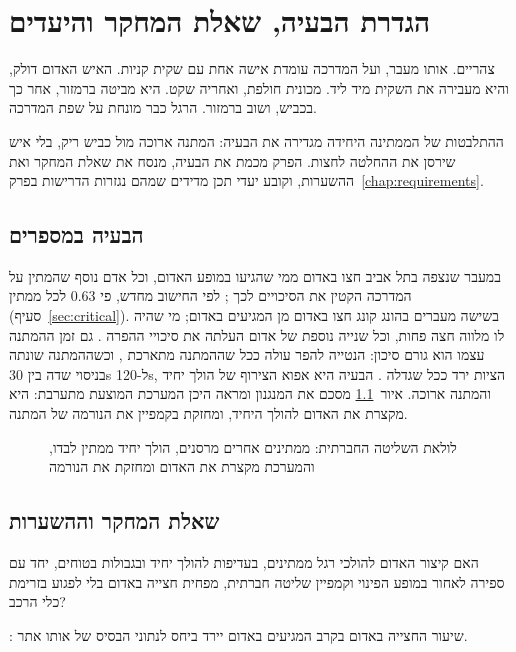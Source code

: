 \chapter{הגדרת הבעיה, שאלת המחקר והיעדים}\label{chap:problem}
\begin{scenebox}
צהריים. אותו מעבר, ועל המדרכה עומדת אישה אחת עם שקית קניות. האיש האדום דולק, והיא מעבירה את השקית מיד ליד.
מכונית חולפת, ואחריה שקט. היא מביטה ברמזור, אחר כך בכביש, ושוב ברמזור.
הרגל כבר מונחת על שפת המדרכה.
\end{scenebox}

ההתלבטות של הממתינה היחידה מגדירה את הבעיה: המתנה ארוכה מול כביש ריק, בלי איש שירסן את ההחלטה לחצות.
הפרק מכמת את הבעיה, מנסח את שאלת המחקר ואת ההשערות, וקובע יעדי תכן מדידים שמהם נגזרות הדרישות בפרק~\ref{chap:requirements}.

\section{הבעיה במספרים}
במעבר שנצפה בתל אביב חצו באדום  ממי שהגיעו במופע האדום, וכל אדם נוסף שהמתין על המדרכה הקטין את הסיכויים לכך \cite{rosenbloom2009}; לפי החישוב מחדש, פי \num{0.63} לכל ממתין (סעיף~\ref{sec:critical}).
בשישה מעברים בהונג קונג חצו באדום  מן המגיעים באדום; מי שהיה לו מלווה חצה פחות, וכל שנייה נוספת של אדום העלתה את סיכויי ההפרה \cite{zhu2021}.
גם זמן ההמתנה עצמו הוא גורם סיכון: הנטייה להפר עולה ככל שההמתנה מתארכת \cite{guo2011}, וכשההמתנה שונתה בניסוי שדה בין \unit{30}{s} ל-\unit{120}{s}, הציות ירד ככל שגדלה \cite{vanhouten2007}.
הבעיה היא אפוא הצירוף של הולך יחיד והמתנה ארוכה. איור~\ref{fig:t4} מסכם את המנגנון ומראה היכן המערכת המוצעת מתערבת: היא מקצרת את האדום להולך היחיד, ומחזקת בקמפיין את הנורמה של המתנה.

\begin{figure}[ht]
  \centering
  \caption{לולאת השליטה החברתית: ממתינים אחרים מרסנים, הולך יחיד ממתין לבדו, והמערכת מקצרת את האדום ומחזקת את הנורמה}
  \label{fig:t4}
\end{figure}

\section{שאלת המחקר וההשערות}
\begin{definitionbox}
האם קיצור האדום להולכי רגל ממתינים, בעדיפות להולך יחיד ובגבולות בטוחים, יחד עם ספירה לאחור במופע הפינוי וקמפיין שליטה חברתית, מפחית חצייה באדום בלי לפגוע בזרימת כלי הרכב?
\end{definitionbox}
: שיעור החצייה באדום בקרב המגיעים באדום יירד ביחס לנתוני הבסיס של אותו אתר.

